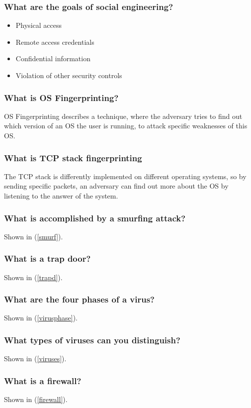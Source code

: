 \documentclass[a4paper, 10 pt, conference]{ieeeconf}
\begin{document}
\subsubsection{\textbf{What are the goals of social engineering?}}
\begin{itemize}
\item Physical access
\item Remote access credentials
\item Confidential information
\item Violation of other security controls
\end{itemize}

\subsubsection{\textbf{What is OS Fingerprinting?}}
OS Fingerprinting describes a technique, where the adversary tries to find out which version of an OS the user is running, to attack specific weaknesses of this OS.
\subsubsection{\textbf{What is TCP stack fingerprinting}}
The TCP stack is differently implemented on different operating systems, so by sending specific packets, an adversary can find out more about the OS by listening to the answer of the system.
\subsubsection{\textbf{What is accomplished by a smurfing attack?}}
Shown in (\ref{smurf}).

\subsubsection{\textbf{What is a trap door?}}
Shown in (\ref{trapd}).
\subsubsection{\textbf{What are the four phases of a virus?}}
Shown in (\ref{virusphase}).
\subsubsection{\textbf{What types of viruses can you distinguish?}}
Shown in (\ref{viruses}).
\subsubsection{\textbf{What is a firewall?}}
Shown in (\ref{firewall}).
\end{document}
